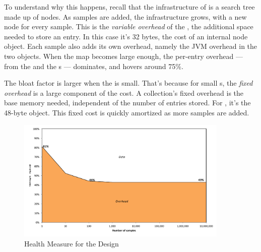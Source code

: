 
To understand why this happens, recall that the infrastructure of
 is a search tree made up of nodes. As samples are added, 
the infrastructure grows, with a new node for every sample. This is
the \emph{variable overhead} of the , the additional
space needed to store an entry. In this case it's 32 bytes,
the cost of an internal node object. Each sample also adds its own overhead,
namely the JVM overhead in the two  objects. When the map becomes large enough,
the per-entry overhead --- from the  and the
s --- dominates, and hovers around 75\%.

The bloat factor is larger when the  is small. That's because for
small s, the \emph{fixed overhead}
is a large component of the cost. A collection's fixed overhead is the base
memory needed, independent of the number of entries stored. For
, it's the 48-byte  object.
This fixed cost is quickly amortized as more samples are added.


\begin{figure}
  \centering
   \includegraphics[width=0.9\textwidth]{part1/Figures/memoryhealth/scalable-health-arraylist}
  \caption{Health Measure for the  Design }
  \label{fig:scalable-health-arraylist}
\end{figure}

